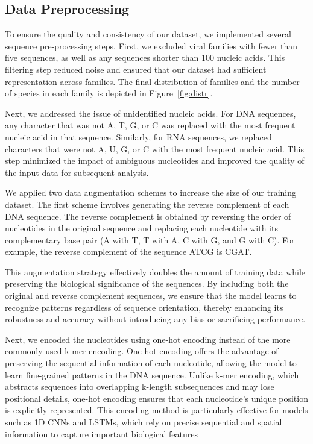 \subsection{Data Preprocessing} To ensure the quality and consistency of our dataset, we implemented several sequence pre-processing steps. First, we excluded viral families with fewer than five sequences, as well as any sequences shorter than 100 nucleic acids. This filtering step reduced noise and ensured that our dataset had sufficient representation across families. The final distribution of families and the number of species in each family is depicted in Figure~\ref{fig:distr}.


Next, we addressed the issue of unidentified nucleic acids. For DNA sequences, any character that was not A, T, G, or C was replaced with the most frequent nucleic acid in that sequence. Similarly, for RNA sequences, we replaced characters that were not A, U, G, or C with the most frequent nucleic acid. This step minimized the impact of ambiguous nucleotides and improved the quality of the input data for subsequent analysis.

We applied two data augmentation schemes to increase the size of our training dataset. The first scheme involves generating the reverse complement of each DNA sequence. The reverse complement is obtained by reversing the order of nucleotides in the original sequence and replacing each nucleotide with its complementary base pair (A with T, T with A, C with G, and G with C). For example, the reverse complement of the sequence ATCG is CGAT.

This augmentation strategy effectively doubles the amount of training data while preserving the biological significance of the sequences. By including both the original and reverse complement sequences, we ensure that the model learns to recognize patterns regardless of sequence orientation, thereby enhancing its robustness and accuracy without introducing any bias or sacrificing performance.

Next, we encoded the nucleotides using one-hot encoding instead of the more commonly used k-mer encoding. One-hot encoding offers the advantage of preserving the sequential information of each nucleotide, allowing the model to learn fine-grained patterns in the DNA sequence. Unlike k-mer encoding, which abstracts sequences into overlapping k-length subsequences and may lose positional details, one-hot encoding ensures that each nucleotide's unique position is explicitly represented. This encoding method is particularly effective for models such as 1D CNNs and LSTMs, which rely on precise sequential and spatial information to capture important biological features

